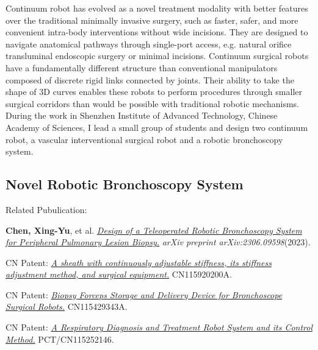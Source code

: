 \documentclass[
    ngerman,american
    ]{scrartcl}
\newcommand{\lang}{en}
\begin{document}
\maketitle
\sectionQuestions{\lang}
        
Continuum robot has evolved as a novel treatment modality with better features over the traditional minimally invasive surgery, such as faster, safer, and more convenient intra-body interventions without wide incisions. They are designed to navigate
anatomical pathways through single-port access, e.g. natural orifice transluminal endoscopic surgery or minimal incisions. Continuum surgical robots have a fundamentally different structure than
conventional manipulators composed of discrete rigid links connected by joints. Their
ability to take the shape of 3D curves enables these robots to perform procedures
through smaller surgical corridors than would be possible with traditional robotic
mechanisms.
During the work in Shenzhen Institute of Advanced Technology, Chinese Academy of Sciences, I lead a small group of students and design two continuum robot, a vascular interventional surgical robot and a robotic bronchoscopy system.


\subsection{Novel Robotic Bronchoscopy System}


Related Pubulication: 

\textbf{Chen, Xing-Yu}, et al. \href{https://doi.org/10.13140/RG.2.2.24714.64963}{\textit{Design of a Teleoperated Robotic Bronchoscopy System for Peripheral Pulmonary Lesion Biopsy.}}  \textit{arXiv preprint arXiv:2306.09598}(2023).



CN Patent: \emph{\href{https://www.researchgate.net/publication/370801235_CN_Patent_yizhonggangdulianxukediaoqiaoguanjiqigangdudiaojiefangfaheshoushushebei}{A sheath with continuously adjustable stiffness, its stiffness adjustment method, and surgical equipment.}} CN115920200A.

CN Patent: \emph{\href{https://www.researchgate.net/publication/370801423_CN_Patent_yizhonghuojianqianshounayudisongzhuangzhiyijizhiqiguanjingshoushujiqiren}{Biopsy Forceps Storage and Delivery Device for Bronchoscope Surgical Robots.}} CN115429343A.


CN Patent: \emph{\href{https://www.researchgate.net/publication/370801247_CN_Patent_yizhongjinghuxidaozhenliaojiqirenxitongjiqikongzhifangfa}{A Respiratory Diagnosis and Treatment Robot System and its Control Method.}} PCT/CN115252146.
\end{document}
